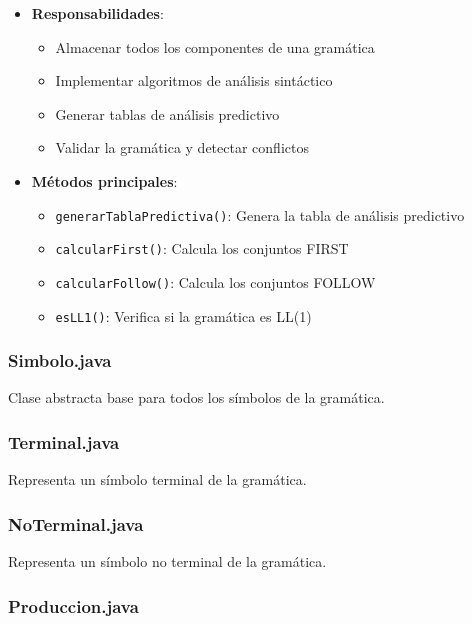 \begin{itemize}
    \item \textbf{Responsabilidades}:
    \begin{itemize}
        \item Almacenar todos los componentes de una gramática
        \item Implementar algoritmos de análisis sintáctico
        \item Generar tablas de análisis predictivo
        \item Validar la gramática y detectar conflictos
    \end{itemize}
    \item \textbf{Métodos principales}:
    \begin{itemize}
        \item \texttt{generarTablaPredictiva()}: Genera la tabla de análisis predictivo
        \item \texttt{calcularFirst()}: Calcula los conjuntos FIRST
        \item \texttt{calcularFollow()}: Calcula los conjuntos FOLLOW
        \item \texttt{esLL1()}: Verifica si la gramática es LL(1)
    \end{itemize}
\end{itemize}

\subsubsection{Simbolo.java}

Clase abstracta base para todos los símbolos de la gramática.

\subsubsection{Terminal.java}

Representa un símbolo terminal de la gramática.

\subsubsection{NoTerminal.java}

Representa un símbolo no terminal de la gramática.

\subsubsection{Produccion.java}


